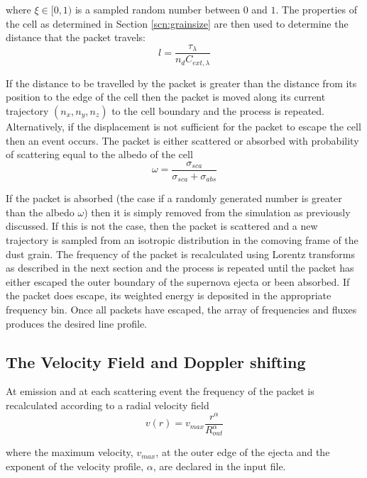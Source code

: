 \noindent where $\xi \in [0,1)$ is a sampled random number between $0$ and $1$.  The properties of the cell as determined in Section \ref{scn:grainsize} are then used to determine the distance that the packet travels:
\begin{equation}
l=\frac{\tau_\lambda}{n_dC_{ext,\lambda}}
\end{equation}

 If the distance to be travelled by the packet is greater than the distance from its position to the edge of the cell then the packet is moved along its current trajectory $(n_x,n_y,n_z)$ to the cell boundary and the process is repeated.  Alternatively, if the displacement is not sufficient for the packet to escape the cell then an event occurs.  The packet is either scattered or absorbed with probability of scattering equal to the albedo of the cell
\begin{equation}
\omega=\frac{\sigma_{sca}}{\sigma_{sca}+\sigma_{abs}}
\end{equation}

If the packet is absorbed (the case if a randomly generated number is greater than the albedo $\omega$) then it is simply removed from the simulation as previously discussed.  If this is not the case, then the packet is scattered and a new trajectory is sampled from an isotropic distribution in the comoving frame of the dust grain.  The frequency of the packet is recalculated using Lorentz transforms as described in the next section and the process is repeated until the packet has either escaped the outer boundary of the supernova ejecta or been absorbed.  If the packet does escape, its weighted energy is deposited in the appropriate frequency bin.  Once all packets have escaped, the array of frequencies and fluxes produces the desired line profile.

\subsection{The Velocity Field and Doppler shifting}

At emission and at each scattering event the frequency of the packet is recalculated according to a radial velocity field 
\begin{equation} 
v(r) = v_{max}\frac{r^{\alpha}}{R_{out}^{\alpha}}
\end{equation}

\noindent where the maximum velocity, $v_{max}$, at the outer edge of the ejecta and the exponent of the velocity profile, $\alpha$, are declared in the input file.	

